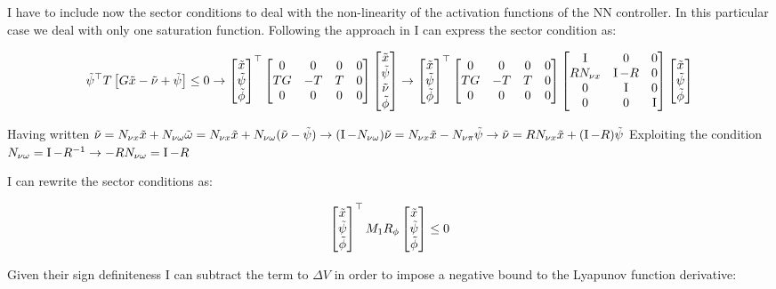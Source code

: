\documentclass{article}
\begin{document}
I have to include now the sector conditions to deal with the non-linearity of the activation functions of the NN controller. In this particular case we deal with only one saturation function. Following the approach in \cite{css-extended} I can express the sector condition as:

$$
  \tilde{\psi}^\top T \left[ G \tilde{x} - \tilde{\nu} + \tilde{\psi} \right] \leq 0 \to \left[\begin{matrix}
    \tilde{x} \\
    \tilde{\psi} \\
    \tilde{\phi}
  \end{matrix}\right]^\top \left[\begin{matrix}
    0 & 0 & 0 & 0 \\
    TG & -T & T & 0 \\
    0 & 0 & 0 & 0
  \end{matrix}\right] \left[\begin{matrix}
    \tilde{x} \\
    \tilde{\psi} \\
    \tilde{\nu} \\
    \tilde{\phi}
  \end{matrix}\right] \to \left[\begin{matrix}
    \tilde{x} \\
    \tilde{\psi} \\
    \tilde{\phi}
  \end{matrix}\right]^\top \left[\begin{matrix}
    0 & 0 & 0 & 0 \\
    TG & -T & T & 0 \\
    0 & 0 & 0 & 0
  \end{matrix}\right] \left[\begin{matrix}
    \operatorname{I} & 0 & 0 \\
    R N_{\nu x} & \operatorname{I} - R & 0 \\
    0 & \operatorname{I} & 0  \\
    0 & 0 & \operatorname{I}
  \end{matrix}\right] \left[\begin{matrix}
    \tilde{x} \\
    \tilde{\psi} \\
    \tilde{\phi}
  \end{matrix}\right]
$$

Having written $\tilde{\nu} = N_{\nu x} \tilde{x} + N_{\nu \omega} \tilde{\omega} = N_{\nu x} \tilde{x} + N_{\nu \omega} (\tilde{\nu} - \tilde{\psi}) \to (\operatorname{I} - N_{\nu \omega}) \tilde{\nu} = N_{\nu x} \tilde{x} - N_{\nu \pi} \tilde{\psi} \to \tilde{\nu} = R N_{\nu x} \tilde{x} + (\operatorname{I} - R) \tilde{\psi}$ 
Exploiting the condition $N_{\nu \omega} = \operatorname{I} - R^{-1} \to -R N_{\nu \omega} = \operatorname{I} - R$

I can rewrite the sector conditions as:

\begin{align*}
  \left[\begin{matrix}
    \tilde{x} \\
    \tilde{\psi} \\
    \tilde{\phi}
  \end{matrix}\right]^\top M_{1} R_{\phi} \left[\begin{matrix}
    \tilde{x} \\
    \tilde{\psi} \\
    \tilde{\phi}
  \end{matrix}\right] \leq 0
\end{align*}

Given their sign definiteness I can subtract the term to $\Delta V$ in order to impose a negative bound to the Lyapunov function derivative:
\end{document}
